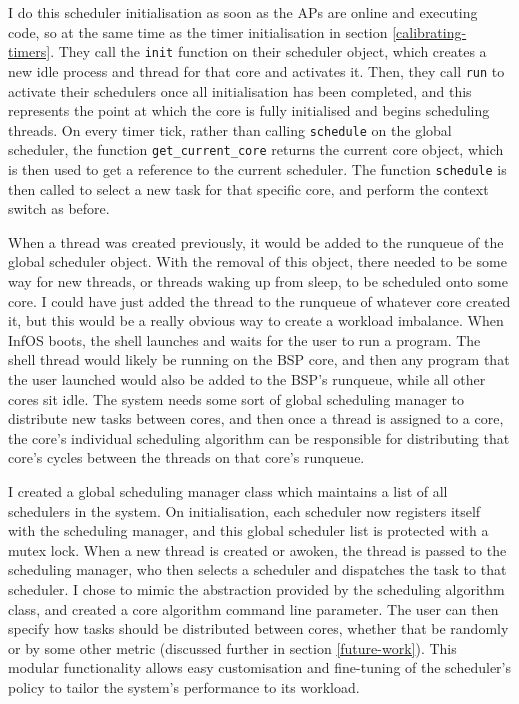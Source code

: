 \documentclass[bsc,frontabs,singlespacing,parskip,deptreport]{infthesis}
\begin{document}
I do this scheduler initialisation as soon as the APs are online and executing code, so at the same time as the timer initialisation in section \ref{calibrating-timers}. They call the \verb|init| function on their scheduler object, which creates a new idle process and thread for that core and activates it. Then, they call \verb|run| to activate their schedulers once all initialisation has been completed, and this represents the point at which the core is fully initialised and begins scheduling threads. On every timer tick, rather than calling \verb|schedule| on the global scheduler, the function \verb|get_current_core| returns the current core object, which is then used to get a reference to the current scheduler. The function \verb|schedule| is then called to select a new task for that specific core, and perform the context switch as before.

When a thread was created previously, it would be added to the runqueue of the global scheduler object. With the removal of this object, there needed to be some way for new threads, or threads waking up from sleep, to be scheduled onto some core. I could have just added the thread to the runqueue of whatever core created it, but this would be a really obvious way to create a workload imbalance. When InfOS boots, the shell launches and waits for the user to run a program. The shell thread would likely be running on the BSP core, and then any program that the user launched would also be added to the BSP's runqueue, while all other cores sit idle. The system needs some sort of global scheduling manager to distribute new tasks between cores, and then once a thread is assigned to a core, the core's individual scheduling algorithm can be responsible for distributing that core's cycles between the threads on that core's runqueue.

I created a global scheduling manager class which maintains a list of all schedulers in the system. On initialisation, each scheduler now registers itself with the scheduling manager, and this global scheduler list is protected with a mutex lock. When a new thread is created or awoken, the thread is passed to the scheduling manager, who then selects a scheduler and dispatches the task to that scheduler. I chose to mimic the abstraction provided by the scheduling algorithm class, and created a core algorithm command line parameter. The user can then specify how tasks should be distributed between cores, whether that be randomly or by some other metric (discussed further in section \ref{future-work}). This modular functionality allows easy customisation and fine-tuning of the scheduler's policy to tailor the system's performance to its workload.
\end{document}
